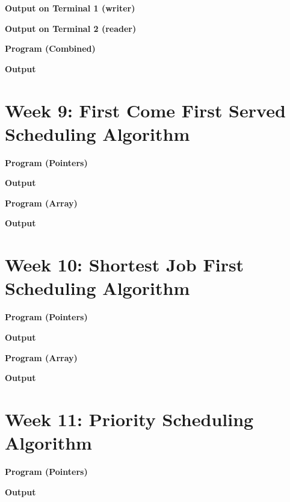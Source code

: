 \documentclass{article}
\begin{document}
\newpage
\noindent \textbf{\large{Output} on Terminal 1 (writer)}
 

\noindent \textbf{\large{Output} on Terminal 2 (reader)}


\newpage
\noindent \textbf{\large{Program (Combined)}}


\newpage
\noindent \textbf{\large{Output}}


\newpage
\section{Week 9: First Come First Served Scheduling Algorithm}

\noindent \textbf{\large{Program (Pointers)}}


\newpage
\noindent \textbf{\large{Output}}


\newpage
\noindent \textbf{\large{Program (Array)}}


\newpage
\noindent \textbf{\large{Output}}


\newpage
\section{Week 10: Shortest Job First Scheduling Algorithm}

\noindent \textbf{\large{Program (Pointers)}}


\newpage
\noindent \textbf{\large{Output}}


\newpage
\noindent \textbf{\large{Program (Array)}}


\newpage
\noindent \textbf{\large{Output}}


\newpage
\section{Week 11: Priority Scheduling Algorithm}

\noindent \textbf{\large{Program (Pointers)}}


\newpage
\noindent \textbf{\large{Output}}

\end{document}
